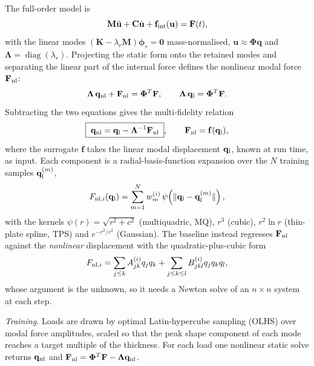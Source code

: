 The full-order model is
\begin{equation}\label{eq:mfs-fom}
\mathbf M\ddot{\mathbf u}+\mathbf C\dot{\mathbf u}+\mathbf f_{\rm int}(\mathbf u)=\mathbf F(t),
\end{equation}
with the linear modes $(\mathbf K-\lambda_r\mathbf M)\boldsymbol\phi_r=\mathbf 0$ mass-normalised, $\mathbf u\approx\boldsymbol\Phi\mathbf q$ and $\boldsymbol\Lambda=\operatorname{diag}(\lambda_r)$. Projecting the static form onto the retained modes and separating the linear part of the internal force defines the nonlinear modal force $\mathbf F_{\rm nl}$:
\begin{equation}\label{eq:mfs-nl}
\boldsymbol\Lambda\,\mathbf q_{\rm nl}+\mathbf F_{\rm nl}=\boldsymbol\Phi^{T}\mathbf F,\qquad
\boldsymbol\Lambda\,\mathbf q_{\rm l}=\boldsymbol\Phi^{T}\mathbf F .
\end{equation}
Subtracting the two equations gives the multi-fidelity relation
\begin{equation}\label{eq:mfs-mf}
\boxed{\;\mathbf q_{\rm nl}=\mathbf q_{\rm l}-\boldsymbol\Lambda^{-1}\mathbf F_{\rm nl}\;},\qquad \mathbf F_{\rm nl}=\mathbf f(\mathbf q_{\rm l}),
\end{equation}
where the surrogate $\mathbf f$ takes the linear modal displacement $\mathbf q_{\rm l}$, known at run time, as input. Each component is a radial-basis-function expansion over the $N$ training samples $\mathbf q_{\rm l}^{(m)}$,
\begin{equation}\label{eq:mfs-rbf}
F_{{\rm nl},i}(\mathbf q_{\rm l})=\sum_{m=1}^{N}w^{(i)}_m\,\psi\!\left(\lVert\mathbf q_{\rm l}-\mathbf q_{\rm l}^{(m)}\rVert\right),
\end{equation}
with the kernels $\psi(r)=\sqrt{r^2+c^2}$ (multiquadric, MQ), $r^3$ (cubic), $r^2\ln r$ (thin-plate spline, TPS) and $e^{-r^2/c^2}$ (Gaussian). The baseline instead regresses $\mathbf F_{\rm nl}$ against the \emph{nonlinear} displacement with the quadratic-plus-cubic form
\begin{equation}\label{eq:mfs-ice}
F_{{\rm nl},i}=\sum_{j\le k}A^{(i)}_{jk}q_jq_k+\sum_{j\le k\le l}B^{(i)}_{jkl}q_jq_kq_l ,
\end{equation}
whose argument is the unknown, so it needs a Newton solve of an $n\times n$ system at each step.

\emph{Training.} Loads are drawn by optimal Latin-hypercube sampling (OLHS) over modal force amplitudes, scaled so that the peak shape component of each mode reaches a target multiple of the thickness. For each load one nonlinear static solve returns $\mathbf q_{\rm nl}$ and $\mathbf F_{\rm nl}=\boldsymbol\Phi^{T}\mathbf F-\boldsymbol\Lambda\mathbf q_{\rm nl}$.

